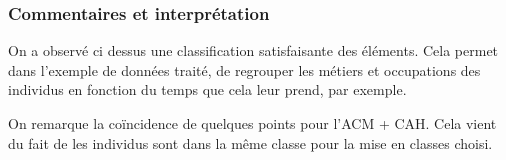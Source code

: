 \subsubsection{Commentaires et interprétation}


On a observé ci dessus une classification satisfaisante des éléments. Cela permet dans l'exemple de données traité, de regrouper les métiers et occupations des individus en fonction du temps que cela leur prend, par exemple.

On remarque la coïncidence de quelques points pour l'ACM + CAH. Cela vient du fait de les individus sont dans la même classe pour la mise en classes choisi. 